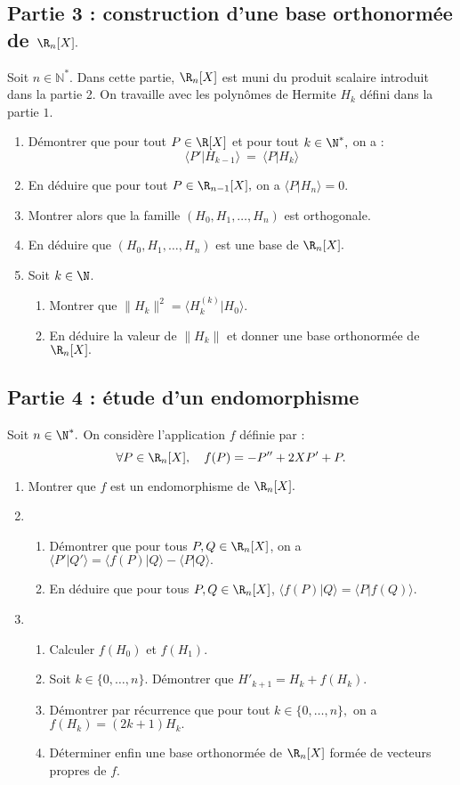 \documentclass[twoside,french,11pt]{VcCours}
\begin{document}
\subsection*{Partie 3 : construction d'une base orthonormée de $\R_n[X].$}

Soit $n \in \mathbb{N}^*$. Dans cette partie, $\R_n[X]$ est muni du produit scalaire introduit dans la partie 2. On travaille avec les polynômes de Hermite $H_k$ défini dans la partie $1.$ 

\begin{enumerate}
  \item Démontrer que pour tout $P\in\R[X]$ et pour tout $k \in\N^*,$ on a :
	$$\langle P'|H_{k-1}\rangle  \ = \ \langle P|H_k\rangle  $$
	\item En déduire que pour tout $P\in\R_{n-1}[X],$ on a 
	$\langle P|H_n\rangle =0.$
	\item Montrer alors que la famille $(H_0,H_1,\dots,H_n)$ est orthogonale.
	\item En déduire que $(H_0,H_1,\dots,H_n)$ est une base de $\R_n[X].$
	\item Soit $k\in\N$.
	\begin{enumerate}
		\item Montrer que $\| H_k\|^2=\langle H_k^{(k)}| H_0\rangle .$
		\item En déduire la valeur de $\|H_k\|$ et donner une base orthonormée de $\R_n[X].$
	\end{enumerate}
\end{enumerate}

\subsection*{Partie 4 : étude d'un endomorphisme}

Soit $n\in\N^*.$ On considère l'application $f$ définie par :
$$\forall P\in\R_n[X],\quad f(P)=-P''+2XP'+P.$$

\begin{enumerate}
	\item Montrer que $f$ est un endomorphisme de $\R_n[X].$
	\item 
	\begin{enumerate}
	\item Démontrer que pour tous $P,Q\in\R_n[X]$, on a $\langle P'|Q'\rangle =\langle f(P)|Q\rangle -\langle P|Q\rangle .$
	\item En déduire que pour tous $P,Q\in\R_n[X]$, $\langle f(P)|Q\rangle  = \langle P|f(Q)\rangle $.
	\end{enumerate}
	\item 
	\begin{enumerate}
	\item Calculer $f(H_0)$ et $f(H_1).$
	\item Soit $k\in\{0,\dots, n\}$. Démontrer que $H'_{k+1}=H_k+f(H_k).$
	\item Démontrer par récurrence que pour tout $k\in\{0,\dots,n\},$ on a $f(H_k)=(2k+1)H_k.$
	\item Déterminer enfin une base orthonormée de $\R_n[X]$ formée de vecteurs propres de $f.$
	\end{enumerate}
\end{enumerate}
\end{document}
